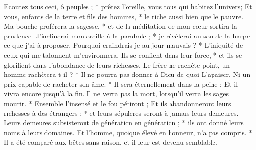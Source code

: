  Ecoutez tous ceci, ô peuples ; * prêtez l'oreille, vous tous qui habitez l'univers;
\versseparator
 Et vous, enfants de la terre et fils des hommes, * le riche aussi bien que le pauvre.
\versseparator
 Ma bouche proférera la sagesse, * et de la méditation de mon cœur sortira la prudence.
\versseparator
 J'inclinerai mon oreille à la parabole ; * je révélerai au son de la harpe ce que j'ai à proposer.
\versseparator
 Pourquoi craindrais-je au jour mauvais ? * L'iniquité de ceux qui me talonnent m'environnera.
\versseparator
 Ils se confient dans leur force, * et ils se glorifient dans l'abondance de leurs richesses.
\versseparator
 Le frère ne rachète point, un homme rachètera-t-il ? * Il ne pourra pas donner à Dieu de quoi L'apaiser,
\versseparator
 Ni un prix capable de racheter son âme. * Il sera éternellement dans la peine ;
\versseparator
 Et il vivra encore jusqu'à la fin. Il ne verra pas la mort, lorsqu'il verra les sages mourir. * Ensemble l'insensé et le fou périront ;
\versseparator
 Et ils abandonneront leurs richesses à des étrangers ; * et leurs sépulcres seront à jamais leurs demeures.
\versseparator
 Leurs demeures subsisteront de génération en génération ; * ils ont donné leurs noms à leurs domaines.
\versseparator
 Et l'homme, quoique élevé en honneur, n'a pas compris. * Il a été comparé aux bêtes sans raison, et il leur est devenu semblable.